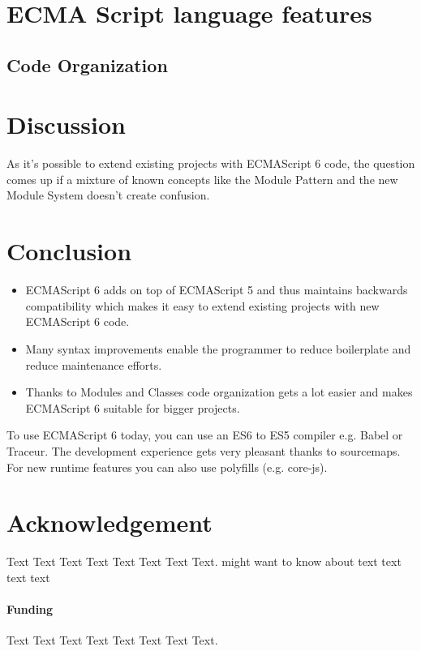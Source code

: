 \documentclass{bioinfo}
\begin{document}
\section{ECMA Script language features}

\subsection{Code Organization}



\section{Discussion}
As it's possible to extend existing projects with ECMAScript 6 code, the question comes up if a mixture of known concepts like the Module Pattern 
and the new Module System doesn't create confusion. 

\section{Conclusion}
\begin{itemize}
        \item ECMAScript 6 adds on top of ECMAScript 5 and thus maintains backwards compatibility which makes it easy to extend existing projects with new ECMAScript 6 code. 
        \item Many syntax improvements enable the programmer to reduce boilerplate and reduce maintenance efforts. 
        \item Thanks to Modules and Classes code organization gets a lot easier and makes ECMAScript 6 suitable for bigger projects.
\end{itemize}
To use ECMAScript 6 today, you can use an ES6 to ES5 compiler e.g. Babel or Traceur. The development experience gets
very pleasant thanks to sourcemaps. For new runtime features you can also use polyfills (e.g. core-js).

\section*{Acknowledgement}
Text Text Text Text Text Text  Text Text.  \citealp{Boffelli03} might want to know about  text text text text

\paragraph{Funding\textcolon} Text Text Text Text Text Text  Text Text.
\end{document}
